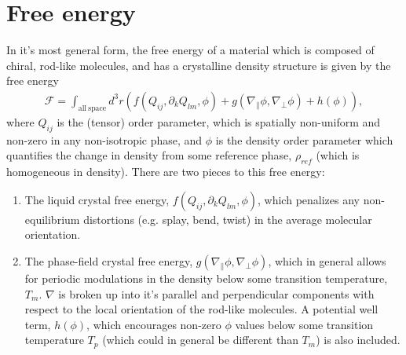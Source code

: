 \documentclass[12pt]{article}
\begin{document}


\section{Free energy}
In it's most general form, the free energy of a material which is composed of chiral, rod-like molecules, and has a crystalline density structure is given by the free energy
\begin{align}\label{eq:Fgeneral}
\mathcal{F} = \int_{\mathrm{all\:space}}d^3r\left(f(Q_{ij},\partial_kQ_{lm},\phi)+g(\nabla_{\parallel}\phi,\nabla_{\bot}\phi)+h(\phi)\right),
\end{align}
where $Q_{ij}$ is the (tensor) order parameter, which is spatially non-uniform and non-zero in any non-isotropic phase, and $\phi$ is the density order parameter which quantifies the change in density from some reference phase, $\rho_{ref}$ (which is homogeneous in density). There are two pieces to this free energy:
\begin{enumerate}[label=\roman*]
	\item The liquid crystal free energy, $f(Q_{ij},\partial_kQ_{lm},\phi)$, which penalizes any non-equilibrium distortions (e.g. splay, bend, twist) in the average molecular orientation.
	\item The phase-field crystal free energy, $g(\nabla_{\parallel}\phi,\nabla_{\bot}\phi)$, which in general allows for periodic modulations in the density below some transition temperature, $T_m$. $\nabla$ is broken up into it's parallel and perpendicular components with respect to the local orientation of the rod-like molecules. A potential well term, $h(\phi)$, which encourages non-zero $\phi$ values below some transition temperature $T_p$ (which could in general be different than $T_m$) is also included.
\end{enumerate}
\end{document}
